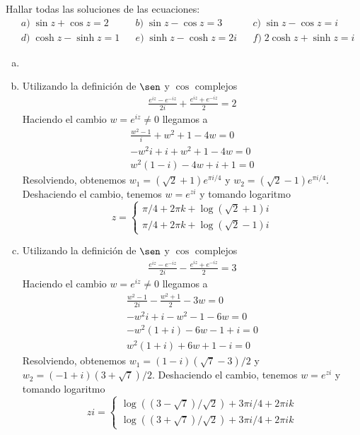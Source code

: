 \documentclass[twoside]{article}
\begin{document}
\begin{ejercicio}{5}
Hallar todas las soluciones de las ecuaciones:
\begin{align*}
&a)\; \sin z+  \cos z = 2 & &b)\;\sin z -\cos z = 3 & &c)\;\sin z -\cos z = i\\
&d)\;\cosh z -\sinh z = 1 & &e)\;\sinh z -\cosh z = 2i & &f)\;2\cosh z +\sinh z = i
\end{align*}
\end{ejercicio}
\begin{solucion}
\begin{enumerate}[a)]
\item[]
\item Utilizando la definición de $\sen$ y $\cos$ complejos
\begin{gather*}
\frac{e^{iz}-e^{-iz}}{2i}+\frac{e^{iz}+e^{-iz}}{2} = 2 
\end{gather*}
Haciendo el cambio $w=e^{iz}\neq 0$ llegamos a
\begin{gather*}
\frac{w^2-1}{i}+w^2+1 - 4w = 0 \\
-w^2i+i+w^2+1-4w = 0\\
w^2(1-i)-4w+i+1 = 0
\end{gather*}
Resolviendo, obtenemos $w_1= (\sqrt{2}+1)e^{\pi i/4}$ y $w_2 = (\sqrt{2}-1)e^{\pi i/4}$. Deshaciendo el cambio, tenemos $w= e^{zi}$ y tomando logaritmo
$$
z = \begin{cases}
\pi/4 +2\pi k + \log(\sqrt{2}+1)i\\
\pi/4 +2\pi k + \log(\sqrt{2}-1)i
\end{cases}
$$
\item Utilizando la definición de $\sen$ y $\cos$ complejos
\begin{gather*}
\frac{e^{iz}-e^{-iz}}{2i}-\frac{e^{iz}+e^{-iz}}{2} = 3 
\end{gather*}
Haciendo el cambio $w=e^{iz}\neq 0$ llegamos a
\begin{gather*}
\frac{w^2-1}{2i}-\frac{w^2+1}{2}-3w=0 \\ 
-w^2i+i - w^2 - 1 -6w  = 0 \\
-w^2(1+i)-6w - 1+i = 0 \\
w^2(1+i)+6w + 1-i = 0
\end{gather*}
Resolviendo, obtenemos $w_1= (1-i)(\sqrt{7}-3)/2$ y $w_2 = (-1+i)(3+\sqrt{7})/2$. Deshaciendo el cambio, tenemos $w= e^{zi}$ y tomando logaritmo
$$
zi = \begin{cases}
\log((3-\sqrt{7})/\sqrt{2})+3\pi i/4 + 2\pi i k\\
\log((3+\sqrt{7})/\sqrt{2})+3\pi i/4 + 2\pi i k

\end{cases}$$
\end{enumerate}
\end{solucion}
\end{document}
